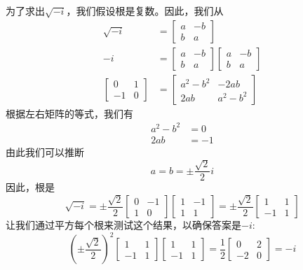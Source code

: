 为了求出$\sqrt{-i}$，我们假设根是复数。因此，我们从
$$
  \begin{aligned}
    \sqrt{-i}                                   & =\left[\begin{array}{cc}
        a & -b \\
        b & a
      \end{array}\right]                                         \\
    -i                                          & =\left[\begin{array}{cc}
        a & -b \\
        b & a
      \end{array}\right]\left[\begin{array}{cc}
        a & -b \\
        b & a
      \end{array}\right] \\
    {\left[\begin{array}{cc}
        0  & 1 \\
        -1 & 0
      \end{array}\right] } & =\left[\begin{array}{cc}
        a^{2}-b^{2} & -2 a b      \\
        2 a b       & a^{2}-b^{2}
      \end{array}\right]
  \end{aligned}
$$
根据左右矩阵的等式，我们有
$$
  \begin{aligned}
    a^{2}-b^{2} & =0  \\
    2 a b       & =-1
  \end{aligned}
$$
由此我们可以推断
$$
  a=b= \pm \frac{\sqrt{2}}{2} i
$$
因此，根是
$$
  \sqrt{-i}= \pm \frac{\sqrt{2}}{2}\left[\begin{array}{cc}
      0 & -1 \\
      1 & 0
    \end{array}\right]\left[\begin{array}{cc}
      1 & -1 \\
      1 & 1
    \end{array}\right]= \pm \frac{\sqrt{2}}{2}\left[\begin{array}{cc}
      1  & 1 \\
      -1 & 1
    \end{array}\right]
$$
让我们通过平方每个根来测试这个结果，以确保答案是$-i$:
$$
  \left( \pm \frac{\sqrt{2}}{2}\right)^{2}\left[\begin{array}{cc}
      1  & 1 \\
      -1 & 1
    \end{array}\right]\left[\begin{array}{cc}
      1  & 1 \\
      -1 & 1
    \end{array}\right]=\frac{1}{2}\left[\begin{array}{cc}
      0  & 2 \\
      -2 & 0
    \end{array}\right]=-i
$$

